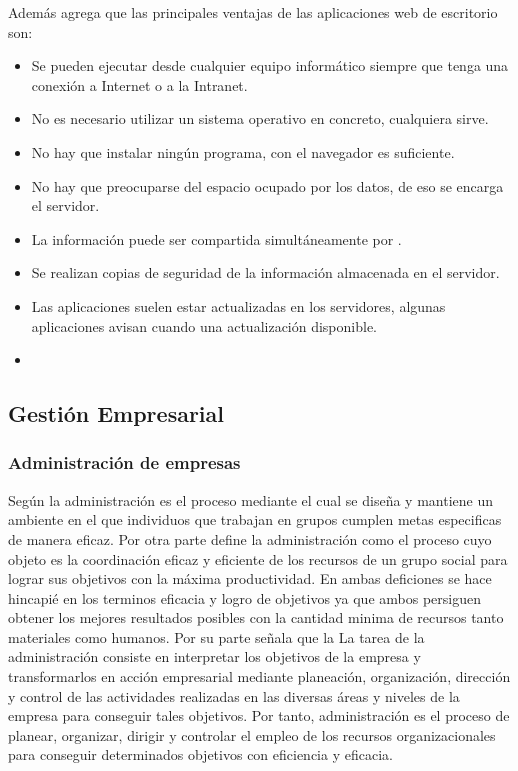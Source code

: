 Adem\'as \cite{nino} agrega que las principales ventajas de las aplicaciones web de
escritorio son:
\begin{itemize}
    \item Se pueden ejecutar desde cualquier equipo inform\'atico siempre que tenga
          una conexi\'on a Internet o a la Intranet.
    \item No es necesario utilizar un sistema operativo en concreto, cualquiera sirve.
    \item No hay que instalar ning\'un programa, con el navegador es suficiente.
    \item No hay que preocuparse del espacio ocupado por los datos, de eso se encarga
          el servidor.
    \item La informaci\'on puede ser compartida simult\'aneamente por .
    \item Se realizan copias de seguridad de la informaci\'on almacenada en el servidor.
    \item Las aplicaciones suelen estar actualizadas en los servidores, algunas
          aplicaciones avisan cuando una actualizaci\'on disponible.
    \item
\end{itemize}

\subsection{Gesti\'on Empresarial}
\subsubsection{Administraci\'on de empresas}
Seg\'un \cite{koontz} la administraci\'on es el proceso mediante el cual se dise\~na
y mantiene un ambiente en el que individuos que trabajan en grupos cumplen metas
especificas de manera eficaz. Por otra parte \citep{galindo} define la administraci\'on
como el proceso cuyo objeto es la coordinaci\'on eficaz y eficiente de los recursos
de un grupo social para lograr sus objetivos con la m\'axima productividad.
En ambas deficiones se hace hincapi\'e en los terminos eficacia y logro de objetivos
ya que ambos persiguen obtener los mejores resultados posibles con la cantidad
minima de recursos tanto materiales como humanos. Por su parte \citep{chiavenato}
se\~nala que la La tarea de la administraci\'on consiste en interpretar los objetivos
de la empresa y transformarlos en acci\'on empresarial mediante planeaci\'on, organizaci\'on,
direcci\'on y control de las actividades realizadas en las diversas \'areas y niveles
de la empresa para conseguir tales objetivos. Por tanto, administraci\'on es el
proceso de planear, organizar, dirigir y controlar el empleo de los recursos
organizacionales para conseguir determinados objetivos con eficiencia y eficacia.

